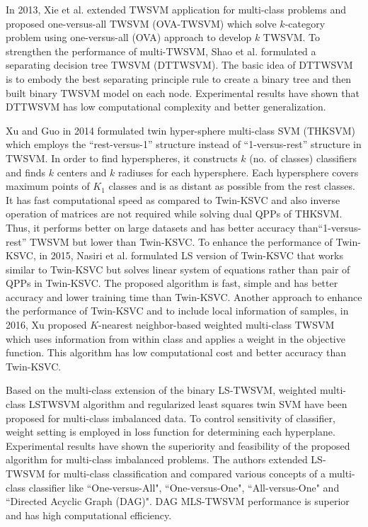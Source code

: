 \documentclass[pdflatex,sn-mathphys]{sn-jnl}%
\theoremstyle{thmstyleone}%
\theoremstyle{thmstyletwo}%
\theoremstyle{thmstylethree}%
\begin{document}
In 2013, Xie et al. \cite{xie2013extending}  extended TWSVM application for multi-class problems and proposed one-versus-all TWSVM (OVA-TWSVM) which solve $k$-category problem using one-versus-all (OVA) approach to develop $k$ TWSVM. To strengthen the performance of multi-TWSVM, Shao et al. \cite{shao2013best} formulated a separating decision tree TWSVM (DTTWSVM). The basic idea of DTTWSVM is to embody the best separating principle rule to create a binary tree and then built binary TWSVM model on each node. Experimental results have shown that DTTWSVM has low computational complexity and better generalization.

Xu and Guo \cite{xu2014twin} in 2014 formulated twin hyper-sphere multi-class SVM (THKSVM) which employs the ``rest-versus-1'' structure instead of  ``1-versus-rest'' structure in TWSVM. In order to find hyperspheres, it constructs $k$ (no. of classes) classifiers and finds $k$ centers and $k$ radiuses for each hypersphere. Each hypersphere covers maximum points of $K_1$ classes and is as distant as possible from the rest classes. It has fast computational speed as compared to Twin-KSVC and also inverse operation of matrices are not required while solving dual QPPs of THKSVM. Thus, it performs better on large datasets and has better accuracy than``1-versus-rest'' TWSVM but lower than Twin-KSVC. To enhance the performance of Twin-KSVC, in 2015, Nasiri et al. \cite{nasiri2015least} formulated LS version of Twin-KSVC that works similar to Twin-KSVC but  solves linear system of equations rather than pair of QPPs in Twin-KSVC. The proposed algorithm is fast, simple and has better accuracy and lower training time than Twin-KSVC. Another approach to enhance the performance of Twin-KSVC and to include local information of samples, in 2016, Xu \cite{xu2016k} proposed $K$-nearest neighbor-based weighted multi-class TWSVM which uses information from within class and applies a weight in the objective function. This algorithm has low computational cost and better accuracy than Twin-KSVC.

Based on the multi-class extension of the binary LS-TWSVM,   weighted multi-class LSTWSVM algorithm \cite{tomar2015effective} and regularized least squares twin SVM  \cite{ali2022regularized} have been proposed for multi-class imbalanced data. To control sensitivity of classifier, weight setting is employed in loss function for determining each hyperplane. Experimental results have shown the superiority and feasibility of the proposed algorithm for multi-class imbalanced problems. The authors \cite{tomar2015comparison} extended LS-TWSVM for multi-class classification and compared various concepts of a multi-class classifier like ``One-versus-All", ``One-versus-One", ``All-versus-One" and ``Directed Acyclic Graph (DAG)". DAG MLS-TWSVM performance is superior and has high computational efficiency.
\end{document}
